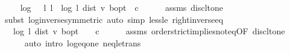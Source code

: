 \begin{isabellebody}
\ \isamarkupfalse%
\ {\isachardoublequoteopen}{\isasymdots}\ {\isacharequal}{\kern0pt}\ {\isacharminus}{\kern0pt}{\isacharparenleft}{\kern0pt}log\ {\isacharparenleft}{\kern0pt}{}\ {\isacharslash}{\kern0pt}\ l{\isacharparenright}{\kern0pt}\ {\isacharparenleft}{\kern0pt}{}{\isacharslash}{\kern0pt}l{\isacharparenright}{\kern0pt}{\isacharparenright}{\kern0pt}\ {\isacharplus}{\kern0pt}\ {\isacharparenleft}{\kern0pt}log\ {\isacharparenleft}{\kern0pt}{}{\isacharslash}{\kern0pt}l{\isacharparenright}{\kern0pt}\ {\isacharparenleft}{\kern0pt}dist\ v\ {\isasymnu}\isactrlsub b{\isacharunderscore}{\kern0pt}opt{\isacharparenright}{\kern0pt}{\isacharparenright}{\kern0pt}\ {\isacharminus}{\kern0pt}\ c{\isachardoublequoteclose}\isanewline
\ \ \ \ \isamarkupfalse%
\ assms\ disc{\isacharunderscore}{\kern0pt}lt{\isacharunderscore}{\kern0pt}one\isanewline
\ \ \ \ \isamarkupfalse%
\ {\isacharparenleft}{\kern0pt}subst\ log{\isacharunderscore}{\kern0pt}inverse{\isacharbrackleft}{\kern0pt}symmetric{\isacharbrackright}{\kern0pt}{\isacharparenright}{\kern0pt}\ {\isacharparenleft}{\kern0pt}auto\ simp{\isacharcolon}{\kern0pt}\ less{\isacharunderscore}{\kern0pt}le\ right{\isacharunderscore}{\kern0pt}inverse{\isacharunderscore}{\kern0pt}eq{\isacharparenright}{\kern0pt}\isanewline
\ \ \isamarkupfalse%
\ \isamarkupfalse%
\ {\isachardoublequoteopen}{\isasymdots}\ {\isacharequal}{\kern0pt}\ {\isacharparenleft}{\kern0pt}log\ {\isacharparenleft}{\kern0pt}{}{\isacharslash}{\kern0pt}l{\isacharparenright}{\kern0pt}\ {\isacharparenleft}{\kern0pt}dist\ v\ {\isasymnu}\isactrlsub b{\isacharunderscore}{\kern0pt}opt{\isacharparenright}{\kern0pt}{\isacharparenright}{\kern0pt}\ {\isacharminus}{\kern0pt}\ {}\ {\isacharminus}{\kern0pt}\ c{\isachardoublequoteclose}\isanewline
\ \ \ \ \isamarkupfalse%
\ assms\ order{\isachardot}{\kern0pt}strict{\isacharunderscore}{\kern0pt}implies{\isacharunderscore}{\kern0pt}not{\isacharunderscore}{\kern0pt}eq{\isacharbrackleft}{\kern0pt}OF\ disc{\isacharunderscore}{\kern0pt}lt{\isacharunderscore}{\kern0pt}one{\isacharbrackright}{\kern0pt}\isanewline
\ \ \ \ \isamarkupfalse%
\ {\isacharparenleft}{\kern0pt}auto\ intro{\isacharbang}{\kern0pt}{\isacharcolon}{\kern0pt}\ log{\isacharunderscore}{\kern0pt}eq{\isacharunderscore}{\kern0pt}one\ neq{\isacharunderscore}{\kern0pt}le{\isacharunderscore}{\kern0pt}trans{\isacharparenright}{\kern0pt}\isanewline
\ \ \isamarkupfalse%
\ \isamarkupfalse%

\end{isabellebody}

